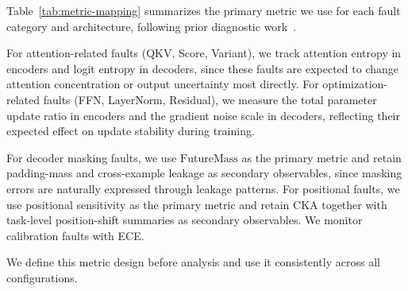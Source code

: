 Table~\ref{tab:metric-mapping} summarizes the primary metric we use for each fault category and architecture, following prior diagnostic work~\citep{attentioncollapse,clark2019does,pascanu2013difficulty,wortsman2024small,guo2017calibration,kornblith2019similarity}.

For attention-related faults (QKV, Score, Variant), we track attention entropy in encoders and logit entropy in decoders, since these faults are expected to change attention concentration or output uncertainty most directly. For optimization-related faults (FFN, LayerNorm, Residual), we measure the total parameter update ratio in encoders and the gradient noise scale in decoders, reflecting their expected effect on update stability during training.

For decoder masking faults, we use $\mathrm{FutureMass}$ as the primary metric and retain padding-mass and cross-example leakage as secondary observables, since masking errors are naturally expressed through leakage patterns. For positional faults, we use positional sensitivity as the primary metric and retain CKA together with task-level position-shift summaries as secondary observables. We monitor calibration faults with ECE.

We define this metric design before analysis and use it consistently across all configurations.

